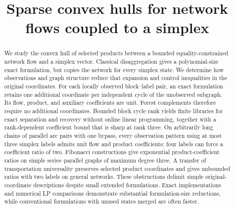 \documentclass[11pt]{article}
\title{Sparse convex hulls for network flows coupled to a simplex}
\author{}
\date{}
\theoremstyle{definition}
\theoremstyle{remark}
\begin{document}
\maketitle
\begin{abstract}
We study the convex hull of selected products between a bounded
equality-constrained network flow and a simplex vector. Classical
disaggregation gives a polynomial-size exact formulation, but copies the
network for every simplex state. We determine how observations and graph
structure reduce that expansion and control inequalities in the original
coordinates. For each locally observed block--label pair, an exact formulation
retains one additional coordinate per independent cycle of the unobserved
subgraph. Its flow, product, and auxiliary coefficients are unit.
Forest complements therefore require
no additional coordinates. Bounded block cycle rank yields finite libraries
for exact separation and recovery without online linear programming, together
with a rank-dependent coefficient bound that is sharp at rank three.
On arbitrarily long chains of parallel arc pairs with one bypass, every
observation pattern using at most three simplex labels admits unit flow
and product coefficients; four labels can force a coefficient ratio of two.
Fibonacci constructions give exponential product-coefficient ratios on
simple series--parallel graphs of maximum degree three. A transfer of
transportation universality preserves selected product coordinates and gives
unbounded ratios with two labels on general networks. These obstructions
delimit simple original-coordinate descriptions despite small extended
formulations. Exact implementations and numerical LP comparisons demonstrate
substantial formulation-size reductions, while conventional formulations
with unused states merged are often faster.
\end{abstract}














\end{document}
